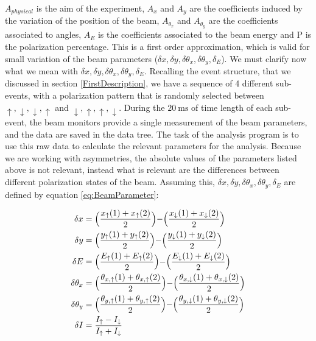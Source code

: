 $A_{physical}$ is the aim of the experiment, $A_{x}$ and $A_{y}$ are the coefficients induced by the variation of the position of the beam, $A_{\theta_{x}}$ and $A_{\theta_{y}}$ are the coefficients associated to angles, $A_{E}$ is the coefficients associated to the beam energy and P is the polarization percentage. 
This is a first order approximation, which is valid for small variation of the beam parameters ($\delta x, \delta y, \delta \theta_{x}, \delta \theta_{y}, \delta_{E}$).
We must clarify now what we mean with $\delta x, \delta y, \delta \theta_{x}, \delta \theta_{y}, \delta_{E}$. Recalling the event structure, that we discussed in section \ref{FirstDescription}, we have a sequence of 4 different sub-events, with a polarization pattern that is randomly selected between $\uparrow,\downarrow,\downarrow, \uparrow$ and $\downarrow,\uparrow,\uparrow,\downarrow$. During the $\SI{20}{\milli \second}$ of time length of each sub-event, the beam monitors provide a single measurement of the beam parameters, and the data are saved in the data tree. The task of the analysis program is to use this raw data to calculate the relevant parameters for the analysis. Because we are working with asymmetries, the absolute values of the parameters listed above is not relevant, instead what is relevant are the differences between different polarization states of the beam. Assuming this, $\delta x, \delta y, \delta \theta_{x}, \delta \theta_{y}, \delta_{E}$ are defined by equation \ref{eq:BeamParameter}:

\begin{equation} \label{eq:BeamParameter}
\begin{split}
\delta {x} & = \Bigl(\dfrac{x_{\uparrow}(1) + x_{\uparrow}(2)}{2}\Bigl)  - \Bigl(\dfrac{x_{\downarrow}(1) + x_{\downarrow}(2)}{2}\Bigl)\\
\delta {y} & = \Bigl(\dfrac{y_{\uparrow}(1) + y_{\uparrow}(2)}{2}\Bigl)  - \Bigl(\dfrac{y_{\downarrow}(1) + y_{\downarrow}(2)}{2}\Bigl)\\
\delta {E} & = \Bigl(\dfrac{E_{\uparrow}(1) + E_{\uparrow}(2)}{2}\Bigl)  - \Bigl(\dfrac{E_{\downarrow}(1) + E_{\downarrow}(2)}{2}\Bigl)\\
\delta {\theta_{x}} & = \Bigl( \dfrac{\theta_{x,\uparrow}(1) + \theta_{x,\uparrow}(2)}{2} \Bigl) - \Bigl(\dfrac{\theta_{x,\downarrow}(1) + \theta_{x,\downarrow}(2)}{2} \Bigl)\\
\delta {\theta_{y}} & = \Bigl( \dfrac{\theta_{y,\uparrow}(1) + \theta_{y,\uparrow}(2)}{2} \Bigl) - \Bigl(\dfrac{\theta_{y,\downarrow}(1) + \theta_{y,\downarrow}(2)}{2} \Bigl)\\ 
\delta I &= \dfrac{I_{\uparrow} - I_{\downarrow}}{I_{\uparrow} + I_{\downarrow}} \\
\end{split}
\end{equation}

